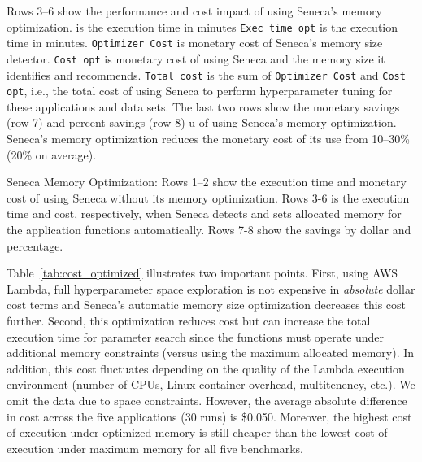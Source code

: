 Rows 3--6 show the performance and cost impact of using Seneca's memory optimization.
is the execution time in minutes 
\texttt{Exec time opt} is the execution time in minutes.
\texttt{Optimizer Cost} is monetary cost of Seneca's memory size detector.
\texttt{Cost opt} is monetary cost of using Seneca and the memory size
it identifies and recommends.
\texttt{Total cost} is the sum of \texttt{Optimizer Cost} and \texttt{Cost opt}, i.e., the total cost of using Seneca to perform hyperparameter tuning for these applications and data sets.
The last two rows show the monetary savings (row 7) and percent savings (row 8) u
of using Seneca's memory optimization.  Seneca's memory optimization reduces
the monetary cost of its use from 10--30\% (20\% on average).


\begin{table}
\centering

\caption{Seneca Memory Optimization: Rows 1--2 show the execution time and  monetary cost of using Seneca without its memory optimization. Rows 3-6 is the execution time and cost, respectively, when Seneca detects and sets allocated memory for the application functions automatically.  Rows 7-8 show the savings by dollar and percentage.
\label{tab:cost_optimized}}
\vspace{-0.2in}
\end{table}

Table~\ref{tab:cost_optimized} illustrates two important points.
First, using AWS Lambda, full hyperparameter space exploration is not expensive in 
\textit{absolute} dollar cost terms and Seneca's automatic memory size optimization
decreases this cost further.  Second, this optimization reduces cost but can 
increase the total execution time for parameter search 
since the functions must operate under additional memory 
constraints (versus using the maximum allocated memory).  
In addition, this cost fluctuates depending on the quality of the Lambda
execution environment (number of CPUs, Linux container overhead, 
multitenency, etc.).  We omit the data due to space constraints.
However, the average absolute difference in cost
across the five applications (30 runs) is \$0.050. %
Moreover, the highest cost of execution under 
optimized memory is still cheaper than the lowest cost of execution 
under maximum memory for all five benchmarks.  


